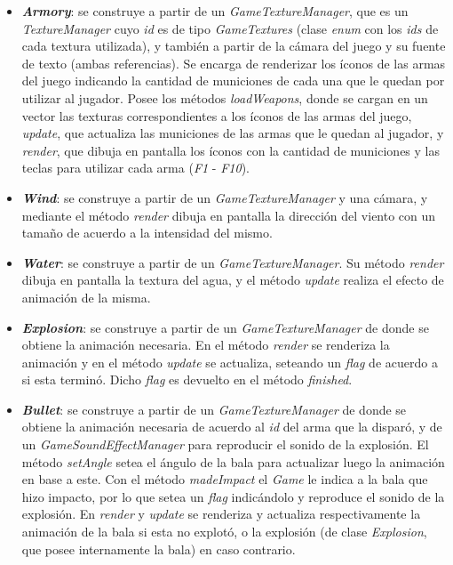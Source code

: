 \begin{itemize}
	\item \textbf{\textit{Armory}}: se construye a partir de un \textit{GameTextureManager}, que es un \textit{TextureManager} cuyo \textit{id} es de tipo \textit{GameTextures} (clase \textit{enum} con los \textit{ids} de cada textura utilizada), y también a partir de la cámara del juego y su fuente de texto (ambas referencias). Se encarga de renderizar los íconos de las armas del juego indicando la cantidad de municiones de cada una que le quedan por utilizar al jugador. Posee los métodos \textit{loadWeapons}, donde se cargan en un vector las texturas correspondientes a los íconos de las armas del juego, \textit{update}, que actualiza las municiones de las armas que le quedan al jugador, y \textit{render}, que dibuja en pantalla los íconos con la cantidad de municiones y las teclas para utilizar cada arma (\textit{F1} - \textit{F10}).
	
	\item \textbf{\textit{Wind}}: se construye a partir de un \textit{GameTextureManager} y una cámara, y mediante el método \textit{render} dibuja en pantalla la dirección del viento con un tamaño de acuerdo a la intensidad del mismo.
	
	\item \textbf{\textit{Water}}: se construye a partir de un \textit{GameTextureManager}. Su método \textit{render} dibuja en pantalla la textura del agua, y el método \textit{update} realiza el efecto de animación de la misma.
	
	\item \textbf{\textit{Explosion}}: se construye a partir de un \textit{GameTextureManager} de donde se obtiene la animación necesaria. En el método \textit{render} se renderiza la animación y en el método \textit{update} se actualiza, seteando un \textit{flag} de acuerdo a si esta terminó. Dicho \textit{flag} es devuelto en el método \textit{finished}.
	
	\item \textbf{\textit{Bullet}}: se construye a partir de un \textit{GameTextureManager} de donde se obtiene la animación necesaria de acuerdo al \textit{id} del arma que la disparó, y de un \textit{GameSoundEffectManager} para reproducir el sonido de la explosión. El método \textit{setAngle} setea el ángulo de la bala para actualizar luego la animación en base a este. Con el método \textit{madeImpact} el \textit{Game} le indica a la bala que hizo impacto, por lo que setea un \textit{flag} indicándolo y reproduce el sonido de la explosión. En \textit{render} y \textit{update} se renderiza y actualiza respectivamente la animación de la bala si esta no explotó, o la explosión (de clase \textit{Explosion}, que posee internamente la bala) en caso contrario.
	

\end{itemize}
